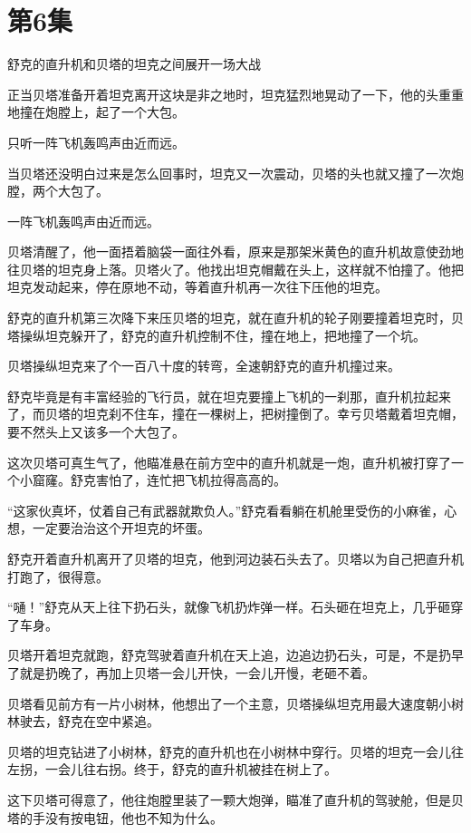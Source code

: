 \documentclass[a4paper,12pt,UTF8,twoside]{ctexbook}
\begin{document}
\chapter{第6集} 

舒克的直升机和贝塔的坦克之间展开一场大战

正当贝塔准备开着坦克离开这块是非之地时，坦克猛烈地晃动了一下，他的头重重地撞在炮膛上，起了一个大包。

只听一阵飞机轰鸣声由近而远。

当贝塔还没明白过来是怎么回事时，坦克又一次震动，贝塔的头也就又撞了一次炮膛，两个大包了。

一阵飞机轰鸣声由近而远。

贝塔清醒了，他一面捂着脑袋一面往外看，原来是那架米黄色的直升机故意使劲地往贝塔的坦克身上落。贝塔火了。他找出坦克帽戴在头上，这样就不怕撞了。他把坦克发动起来，停在原地不动，等着直升机再一次往下压他的坦克。

舒克的直升机第三次降下来压贝塔的坦克，就在直升机的轮子刚要撞着坦克时，贝塔操纵坦克躲开了，舒克的直升机控制不住，撞在地上，把地撞了一个坑。

贝塔操纵坦克来了个一百八十度的转弯，全速朝舒克的直升机撞过来。

舒克毕竟是有丰富经验的飞行员，就在坦克要撞上飞机的一刹那，直升机拉起来了，而贝塔的坦克刹不住车，撞在一棵树上，把树撞倒了。幸亏贝塔戴着坦克帽，要不然头上又该多一个大包了。

这次贝塔可真生气了，他瞄准悬在前方空中的直升机就是一炮，直升机被打穿了一个小窟窿。舒克害怕了，连忙把飞机拉得高高的。

“这家伙真坏，仗着自己有武器就欺负人。”舒克看看躺在机舱里受伤的小麻雀，心想，一定要治治这个开坦克的坏蛋。

舒克开着直升机离开了贝塔的坦克，他到河边装石头去了。贝塔以为自己把直升机打跑了，很得意。

“嗵！”舒克从天上往下扔石头，就像飞机扔炸弹一样。石头砸在坦克上，几乎砸穿了车身。

贝塔开着坦克就跑，舒克驾驶着直升机在天上追，边追边扔石头，可是，不是扔早了就是扔晚了，再加上贝塔一会儿开快，一会儿开慢，老砸不着。

贝塔看见前方有一片小树林，他想出了一个主意，贝塔操纵坦克用最大速度朝小树林驶去，舒克在空中紧追。

贝塔的坦克钻进了小树林，舒克的直升机也在小树林中穿行。贝塔的坦克一会儿往左拐，一会儿往右拐。终于，舒克的直升机被挂在树上了。

这下贝塔可得意了，他往炮膛里装了一颗大炮弹，瞄准了直升机的驾驶舱，但是贝塔的手没有按电钮，他也不知为什么。
\end{document}
